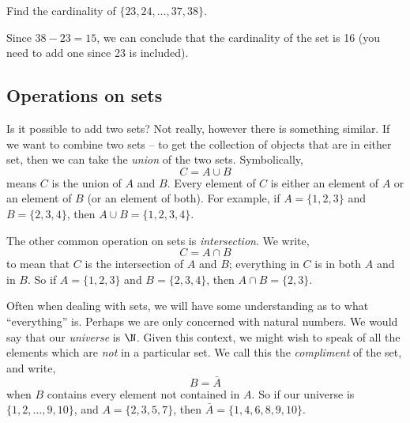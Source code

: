 \begin{example}
 Find the cardinality of $\{23, 24, \ldots, 37, 38\}$.  
\begin{solution}
 Since $38 - 23 = 15$, we can conclude that the cardinality of the set is 16 (you need to add one since 23 is included).
\end{solution}
\end{example}

\subsection*{Operations on sets}

Is it possible to add two sets?  Not really, however there is something similar.  If we want to combine two sets -- to get the collection of objects that are in either set, then we can take the {\em union} of the two sets.  Symbolically,
\[ C = A \cup B\]
means $C$ is the union of $A$ and $B$.  Every element of $C$ is either an element of $A$ or an element of $B$ (or an element of both).  For example, if $A = \{1, 2, 3\}$ and $B = \{2, 3, 4\}$, then $A \cup B = \{1, 2, 3, 4\}$.

The other common operation on sets is {\em intersection}.  We write,
\[ C = A \cap B\]
to mean that $C$ is the intersection of $A$ and $B$; everything in $C$ is in both $A$ and in $B$.  So if $A = \{1, 2, 3\}$ and $B = \{2, 3, 4\}$, then $A \cap B = \{2, 3\}$.  

Often when dealing with sets, we will have some understanding as to what ``everything'' is.  Perhaps we are only concerned with natural numbers.  We would say that our {\em universe} is $\N$.  Given this context, we might wish to speak of all the elements which are {\em not} in a particular set.  We call this the {\em compliment} of the set, and write,
\[ B = \bar A\]
when $B$ contains every element not contained in $A$.  So if our universe is $\{1, 2,\ldots, 9, 10\}$, and $A = \{2, 3, 5, 7\}$, then $\bar A = \{1, 4, 6, 8, 9,10\}$.

